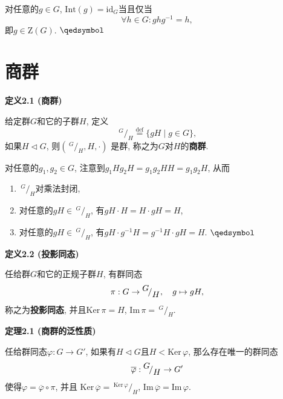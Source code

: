 \documentclass[UTF8]{ctexart}
\begin{document}

对任意的$g\in G$, $\mathrm{Int}(g)=\mathrm{id}_{G}$当且仅当
\[
    \forall h\in G:ghg^{-1}=h,
\]
即$g\in \mathrm{Z}(G)$. \hfill $\qedsymbol$





\newpage

\section{商群}

\hypertarget{sec:定义2.1}{}
\noindent\textbf{定义2.1 (商群)}

给定群$G$和它的子群$H$, 定义
\[
    \,\!^{\displaystyle G}\!/_{\displaystyle H}\overset{\mathrm{def}}{=}
    \{gH\mid g\in G\},
\]
如果$H\lhd G$,
则$\left(\,\!^{\displaystyle G}\!/_{\displaystyle H},H,\cdot\right)$
是群, 称之为$G$对$H$的\textbf{商群}.


对任意的$g_1,g_2\in G$, 注意到$g_1Hg_2H=g_1g_2HH=g_1g_2H$, 从而
\vspace{3pt}
\begin{enumerate}
    \item $\,\!^{\displaystyle G}\!/_{\displaystyle H}$对乘法封闭,
    \vspace{3pt}
    \item 对任意的$gH\in\,\!^{\displaystyle G}\!/_{\displaystyle H}$,
    有$gH\cdot H=H\cdot gH=H$,
    \vspace{3pt}
    \item 对任意的$gH\in\,\!^{\displaystyle G}\!/_{\displaystyle H}$,
    有$gH\cdot g^{-1}H=g^{-1}H\cdot gH=H$. \hfill $\qedsymbol$
\end{enumerate}

\vspace{10pt}

\hypertarget{sec:定义2.2}{}
\noindent\textbf{定义2.2 (投影同态)}

任给群$G$和它的正规子群$H$, 有群同态
\[
    \pi:G\to\,\!^{\displaystyle G}\!/_{\displaystyle H},\quad g\mapsto gH,\\[3pt]
\]
称之为\textbf{投影同态}, 并且$\mathrm{Ker}\,\pi=H$,
$\mathrm{Im}\,\pi=\,\!^{\displaystyle G}\!/_{\displaystyle H}$.

\vspace{15pt}

\hypertarget{sec:定理2.1}{}
\noindent\textbf{定理2.1 (商群的泛性质)}

任给群同态$\varphi:G\to G'$, 如果有$H\lhd G$且$H<\mathrm{Ker}\,\varphi$,
那么存在唯一的群同态
\vspace{3pt}
\[
    \overline{\varphi}:\,\!^{\displaystyle G}\!/_{\displaystyle H}\to G'\\[3pt]
\]
使得$\varphi=\overline{\varphi}\circ\pi$, 并且
$\mathrm{Ker}\,\overline{\varphi}=
\,\!^{\displaystyle\mathrm{Ker}\,\varphi}\!/_{\displaystyle H}$,
$\mathrm{Im}\,\overline{\varphi}=\mathrm{Im}\,\varphi$.
\end{document}
